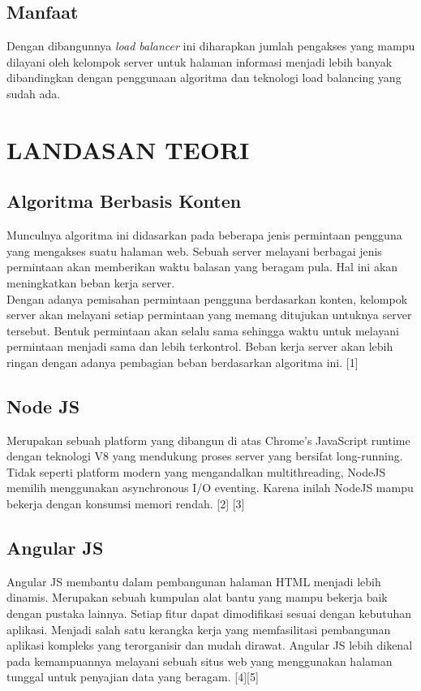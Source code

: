\documentclass{ta-its}
\begin{document}
        \section{Manfaat}
	Dengan dibangunnya \emph{load balancer} ini diharapkan jumlah pengakses yang mampu dilayani oleh kelompok server untuk halaman informasi menjadi lebih banyak dibandingkan dengan penggunaan algoritma dan teknologi load balancing yang sudah ada.

   \chapter{LANDASAN TEORI}
        \section{Algoritma Berbasis Konten}
	Munculnya algoritma ini didasarkan pada beberapa jenis permintaan pengguna yang mengakses suatu halaman web. Sebuah server melayani berbagai jenis permintaan akan memberikan waktu balasan yang beragam pula. Hal ini akan meningkatkan beban kerja server. \\
\indent Dengan adanya pemisahan permintaan pengguna berdasarkan konten, kelompok server akan melayani setiap permintaan yang memang ditujukan untuknya server tersebut. Bentuk permintaan akan selalu sama sehingga waktu untuk melayani permintaan menjadi sama dan lebih terkontrol. Beban kerja server akan lebih ringan dengan adanya pembagian beban berdasarkan algoritma ini. [1]

        \section{Node JS}
	Merupakan sebuah platform yang dibangun di atas Chrome's JavaScript runtime dengan teknologi V8 yang mendukung proses server yang bersifat long-running. Tidak seperti platform modern yang mengandalkan multithreading, NodeJS memilih menggunakan asynchronous I/O eventing. Karena inilah NodeJS mampu bekerja dengan konsumsi memori rendah. [2] [3]

        \section{Angular JS}
	Angular JS membantu dalam pembangunan halaman HTML menjadi lebih dinamis. Merupakan sebuah kumpulan alat bantu yang mampu bekerja baik dengan pustaka lainnya. Setiap fitur dapat dimodifikasi sesuai dengan kebutuhan aplikasi. Menjadi salah satu kerangka kerja yang memfasilitasi pembangunan aplikasi kompleks yang terorganisir dan mudah dirawat. Angular JS lebih dikenal pada kemampuannya melayani sebuah situs web yang menggunakan halaman tunggal untuk penyajian data yang beragam. [4][5]
\end{document}
